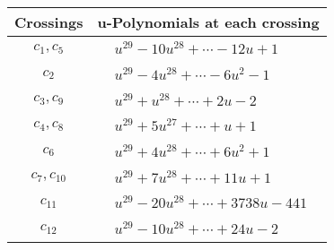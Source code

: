 \documentclass[1p]{elsarticle_modified}
\theoremstyle{definition}
\begin{document}
\begin{tabular}{m{50pt}|m{274pt}}
Crossings & \hspace{64pt}u-Polynomials at each crossing \\
\hline $$\begin{aligned}c_{1},c_{5}\end{aligned}$$&$\begin{aligned}
&u^{29}-10 u^{28}+\cdots-12 u+1
\end{aligned}$\\
\hline $$\begin{aligned}c_{2}\end{aligned}$$&$\begin{aligned}
&u^{29}-4 u^{28}+\cdots-6 u^2-1
\end{aligned}$\\
\hline $$\begin{aligned}c_{3},c_{9}\end{aligned}$$&$\begin{aligned}
&u^{29}+u^{28}+\cdots+2 u-2
\end{aligned}$\\
\hline $$\begin{aligned}c_{4},c_{8}\end{aligned}$$&$\begin{aligned}
&u^{29}+5 u^{27}+\cdots+u+1
\end{aligned}$\\
\hline $$\begin{aligned}c_{6}\end{aligned}$$&$\begin{aligned}
&u^{29}+4 u^{28}+\cdots+6 u^2+1
\end{aligned}$\\
\hline $$\begin{aligned}c_{7},c_{10}\end{aligned}$$&$\begin{aligned}
&u^{29}+7 u^{28}+\cdots+11 u+1
\end{aligned}$\\
\hline $$\begin{aligned}c_{11}\end{aligned}$$&$\begin{aligned}
&u^{29}-20 u^{28}+\cdots+3738 u-441
\end{aligned}$\\
\hline $$\begin{aligned}c_{12}\end{aligned}$$&$\begin{aligned}
&u^{29}-10 u^{28}+\cdots+24 u-2
\end{aligned}$\\
\hline
\end{tabular}\\~\\
\end{document}
